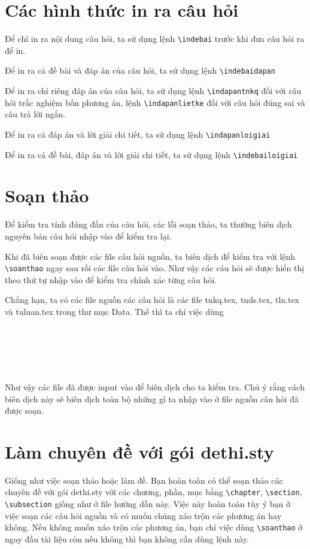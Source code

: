 \section{Các hình thức in ra câu hỏi}
Để chỉ in ra nội dung câu hỏi, ta sử dụng lệnh \verb'\indebai' trước khi đưa câu hỏi ra để in.

Để in ra cả đề bài và đáp án của câu hỏi, ta sử dụng lệnh \verb'\indebaidapan'

Để in ra chỉ riêng đáp án của câu hỏi, ta sử dụng lệnh \verb'\indapantnkq' đối với câu hỏi trắc nghiệm bốn phương án, lệnh \verb'\indapanlietke' đối với câu hỏi đúng sai và câu trả lời ngắn.

Để in ra cả đáp án và lời giải chi tiết, ta sử dụng lệnh \verb'\indapanloigiai'

Để in ra cả đề bài, đáp án và lời giải chi tiết, ta sử dụng lệnh \verb'\indebailoigiai'
\section{Soạn thảo}
Để kiểm tra tính đúng đắn của câu hỏi, các lỗi soạn thảo, ta thường biên dịch nguyên bản câu hỏi nhập vào để kiểm tra lại.

Khi đã biên soạn được các file câu hỏi nguồn, ta biên dịch để kiểm tra với lệnh \verb'\soanthao' ngay sau \verb'' rồi \verb'' các file câu hỏi vào. Như vậy các câu hỏi sẽ được hiển thị theo thứ tự nhập vào để kiểm tra chính xác từng câu hỏi.
	
	Chẳng hạn, ta có các file nguồn các câu hỏi là các file tnkq.tex, tnds.tex, tln.tex và tuluan.tex trong thư mục Data. Thế thì ta chỉ việc dùng
	
	\begin{verbatim}
		
		
		
		
	\end{verbatim}
	
	Như vậy các file đã được input vào để biên dịch cho ta kiểm tra. Chú ý rằng cách biên dịch này sẽ biên dịch toàn bộ những gì ta nhập vào ở file nguồn câu hỏi đã được soạn.
	
	\section{Làm chuyên đề với gói dethi.sty}
	Giống như việc soạn thảo hoặc làm đề. Bạn hoàn toàn có thể soạn thảo các chuyên đề với gói dethi.sty với các chương, phần, mục bằng \verb'\chapter', \verb'\section', \verb'\subsection' giống như ở file hướng dẫn này. Việc này hoàn toàn tùy ý bạn ở việc soạn các câu hỏi nguồn và có muốn chúng xáo trộn các phương án hay không. Nếu không muốn xáo trộn các phương án, bạn chỉ việc dùng \verb'\soanthao' ở ngay đầu tài liệu còn nếu không thì bạn không cần dùng lệnh này.
	

